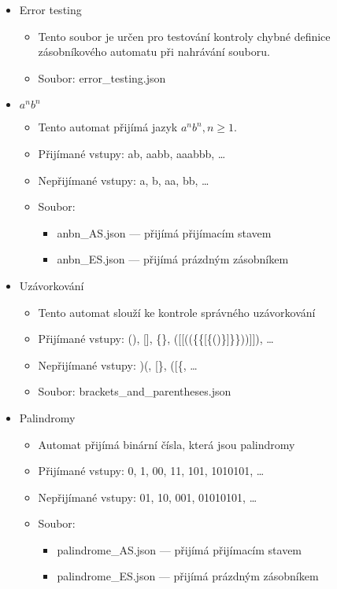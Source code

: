 \begin{itemize}
    \item Error testing
        \begin{itemize}
            \item Tento soubor je určen pro testování kontroly chybné definice zásobníkového automatu při nahrávání souboru.
            \item Soubor: error\_testing.json
        \end{itemize}
    \item $a^{n}b^{n}$
        \begin{itemize}
            \item Tento automat přijímá jazyk $a^nb^n, n \ge 1$.
            \item Přijímané vstupy: ab, aabb, aaabbb, \ldots
            \item Nepřijímané vstupy: a, b, aa, bb, \ldots
            \item Soubor:
                \begin{itemize}
                    \item anbn\_AS.json --- přijímá přijímacím stavem
                    \item anbn\_ES.json --- přijímá prázdným zásobníkem
                \end{itemize}
        \end{itemize}
    \item Uzávorkování
        \begin{itemize}
            \item Tento automat slouží ke kontrole správného uzávorkování
            \item Přijímané vstupy: (), [], \{\}, ([[((\{\{[\{()\}]\}\}))]]), \ldots
            \item Nepřijímané vstupy: )(, [\}, ([\{, \ldots
            \item Soubor: brackets\_and\_parentheses.json
        \end{itemize}
    \item Palindromy
        \begin{itemize}
            \item Automat přijímá binární čísla, která jsou palindromy
            \item Přijímané vstupy: 0, 1, 00, 11, 101, 1010101, \ldots
            \item Nepřijímané vstupy: 01, 10, 001, 01010101, \ldots
            \item Soubor: 
            \begin{itemize}
                \item palindrome\_AS.json --- přijímá přijímacím stavem
                \item palindrome\_ES.json --- přijímá prázdným zásobníkem
            \end{itemize}
        \end{itemize}
\end{itemize}

\endinput